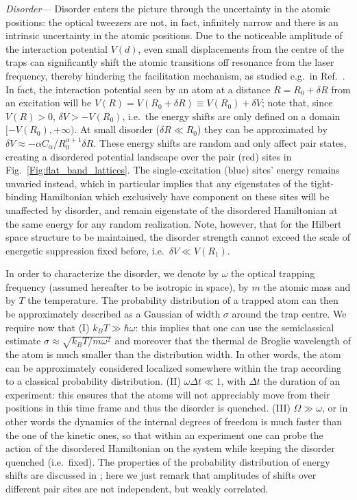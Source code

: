 \documentclass[prl,aps,twocolumn,showpacs,superscriptaddress,longbibliography]{revtex4-1}
\begin{document}
\emph{Disorder---} Disorder enters the picture through the uncertainty in the atomic positions: the optical tweezers are not, in fact, infinitely narrow and there is an intrinsic uncertainty in the atomic positions. Due to the noticeable amplitude of the interaction potential $V(d)$, even small displacements from the centre of the traps can significantly shift the atomic transitions off resonance from the laser frequency, thereby hindering the facilitation mechanism, as studied e.g.~in Ref.~\cite{a_Marcuzzi_PRL_17}. In fact, the interaction potential seen by an atom at a distance $R = R_0 + \delta R$ from an excitation will be $V(R) = V(R_0 + \delta R) \equiv V(R_0) + \delta V$; note that, since $V(R) >0$, $\delta V > - V(R_0)$, i.e.~the energy shifts are only defined on a domain $[-V(R_0), +\infty)$. At small disorder ($\delta R \ll R_0$) they can be approximated by $\delta V \approx -\alpha C_\alpha / R_0^{\alpha + 1} \delta R$. These energy shifts are random and only affect pair states, creating a disordered potential landscape over the pair (red) sites in Fig.~\ref{Fig:flat_band_lattices}. The single-excitation (blue) sites' energy remains unvaried instead, which in particular implies that any eigenstates of the tight-binding Hamiltonian which exclusively have component on these sites will be unaffected by disorder, and remain eigenstate of the disordered Hamiltonian at the same energy for any random realization. Note, however, that for the Hilbert space structure to be maintained, the disorder strength cannot exceed the scale of energetic suppression fixed before, i.e.~$\delta V \ll V(R_1)$.

In order to characterize the disorder, we denote by $\omega$ the optical trapping frequency (assumed hereafter to be isotropic in space), by $m$ the atomic mass and by $T$ the temperature. The probability distribution of a trapped atom can then be approximately described as a Gaussian of width $\sigma$ around the trap centre. We require now that (I) $k_B T \gg \hbar \omega$: this implies that one can use the semiclassical estimate $\sigma \approx \sqrt{k_B T / m\omega^2}$ and moreover that the thermal de Broglie wavelength of the atom is much smaller than the distribution width. In other words, the atom can be approximately considered localized somewhere within the trap according to a classical probability distribution. (II) $\omega \Delta t \ll 1$, with $\Delta t$ the duration of an experiment: this ensures that the atoms will not appreciably move from their positions in this time frame and thus the disorder is quenched. (III) $\Omega \gg \omega$, or in other words the dynamics of the internal degrees of freedom is much faster than the one of the kinetic ones, so that within an experiment one can probe the action of the disordered Hamiltonian on the system while keeping the disorder quenched (i.e.~fixed). The properties of the probability distribution of energy shifts are discussed in \cite{SM}; here we just remark that amplitudes of shifts over different pair sites are not independent, but weakly correlated.
\end{document}
